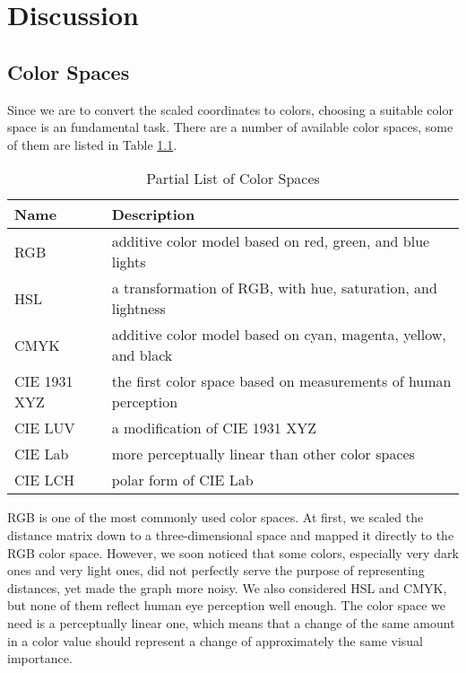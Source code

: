\chapter{Discussion}\label{chap:Discussion}

\section{Color Spaces}

Since we are to convert the scaled coordinates to colors, choosing a suitable color space is an fundamental task. There are a number of available color spaces, some of them are listed in Table \ref{tab:color_spaces}.

\begin{table}[htb]
\caption{Partial List of Color Spaces}\label{tab:color_spaces}\centering\small
\begin{tabular}{ll} \toprule
  Name          & Description                                                     \\ \hline
  RGB           & additive color model based on red, green, and blue lights       \\
  HSL           & a transformation of RGB, with hue, saturation, and lightness    \\
  CMYK          & additive color model based on cyan, magenta, yellow, and black  \\
  CIE 1931 XYZ  & the first color space based on measurements of human perception \\
  CIE LUV       & a modification of CIE 1931 XYZ                                  \\
  CIE Lab       & more perceptually linear than other color spaces                \\
  CIE LCH       & polar form of CIE Lab                                           \\ \bottomrule
\end{tabular}
\end{table}

RGB is one of the most commonly used color spaces. At first, we scaled the distance matrix down to a three-dimensional space and mapped it directly to the RGB color space. However, we soon noticed that some colors, especially very dark ones and very light ones, did not perfectly serve the purpose of representing distances, yet made the graph more noisy. We also considered HSL and CMYK, but none of them reflect human eye perception well enough. The color space we need is a perceptually linear one, which means that a change of the same amount in a color value should represent a change of approximately the same visual importance.

